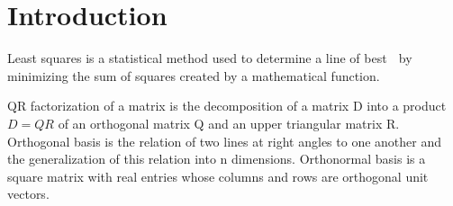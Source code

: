 \documentclass[12pt]{article}
\begin{document}
	\section{Introduction }
	
	
	Least  squares is a statistical method used to determine a line of best 
	by minimizing the sum of squares created by a mathematical function. 
	
	QR factorization of a matrix is the decomposition of a matrix D into a product 
	$D=QR$ of an orthogonal matrix Q and an upper triangular matrix R. Orthogonal basis is the relation of two lines at right angles to one another and the generalization of this relation into n dimensions. Orthonormal basis is a square matrix with real entries whose columns and rows are orthogonal unit vectors. 
	
\end{document}
